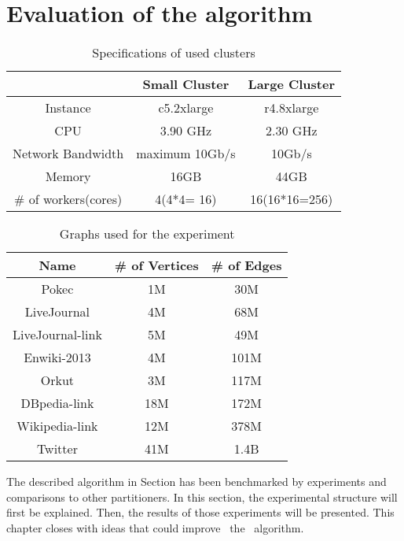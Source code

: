 \documentclass[acmsmall,nonacm,screen,review]{acmart}
\begin{document}
\section{Evaluation of the algorithm}
\begin{table}[bt!]
    \centering
    \begin{tabular}{ccc}
    \hline
     & Small Cluster & Large Cluster \\
    \hline
     Instance & c5.2xlarge & r4.8xlarge\\
     CPU & 3.90 GHz & 2.30 GHz\\
     Network Bandwidth & maximum 10Gb/s & 10Gb/s\\
    Memory  & 16GB & 44GB\\
     \# of workers(cores) & 4(4*4= 16) & 16(16*16=256)\\
     \hline
    \end{tabular}
    \caption{Specifications of used clusters}
    \label{clusters}
\end{table}
\begin{table}[bt!]
    \centering
    \begin{tabular}{ccc}
    \hline
    Name & \# of Vertices & \# of Edges \\
    \hline
     Pokec & 1M & 30M\\
     LiveJournal & 4M & 68M\\
     LiveJournal-link & 5M & 49M \\
     Enwiki-2013 & 4M & 101M \\
     Orkut & 3M & 117M\\
     DBpedia-link & 18M & 172M \\
     Wikipedia-link & 12M & 378M\\
     Twitter & 41M & 1.4B\\
     \hline
    \end{tabular}
    \caption{Graphs used for the experiment}
    \label{graphs}
\end{table}
The described algorithm in Section  has been benchmarked by experiments and comparisons to other partitioners. In this section, the experimental structure will first be explained. Then, the results of those experiments will be presented. This chapter closes with ideas that could improve ~the ~algorithm.
\end{document}
